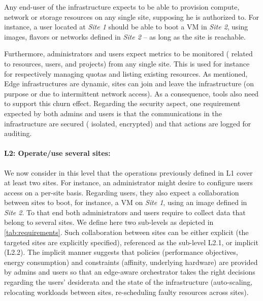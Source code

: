 Any end-user of the infrastructure expects to be able to provision compute,
network or storage resources on any single site, supposing he is authorized to.
For instance, a user located at \emph{Site 1} should be able to boot a VM in
\emph{Site 2}, using images, flavors or networks defined in \emph{Site 2} -- as
long as the site is reachable.

Furthermore, administrators and users expect metrics to be monitored (\eg
related to resources, users, and projects) from any single site. This is used
for instance for respectively managing quotas and listing existing resources.
As mentioned, Edge infrastructures are dynamic, \ie sites can join and leave the
infrastructure (on purpose or due to intermittent network access). As a
consequence, tools also need to support this churn effect.
Regarding the security aspect, one requirement expected by both admins and
users is that the communications in the infrastructure are secured (\eg
isolated, encrypted) and that actions are logged for auditing.

\paragraph{L2: Operate/use several sites:}
We now consider in this level that the operations previously defined in L1
cover at least two sites. For instance, an administrator might desire to
configure users access on a per-site basis. Regarding users, they also expect
a collaboration between sites to boot, for instance, a VM on \emph{Site 1},
using an image defined in \emph{Site 2}. To that end both administrators and
users require to collect data that belong to several sites. We define here two
sub-levels as depicted in \cref{tab:requirements}. Such collaboration between
sites can be either explicit (\ie the targeted sites are explicitly specified),
referenced as the sub-level L2.1, or implicit (L2.2). The implicit manner
suggests that policies (\eg performance objectives, energy consumption) and
constraints (\eg affinity, underlying hardware) are provided by admins and users so
that an edge-aware orchestrator takes the right decisions regarding the users'
desiderata and the state of the infrastructure (\eg auto-scaling, relocating
workloads between sites, re-scheduling faulty resources across sites).

